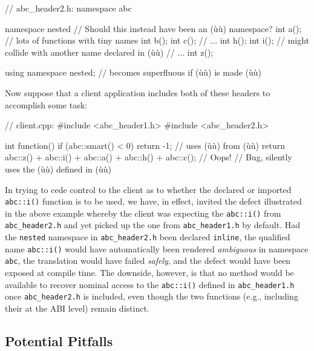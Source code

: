 \begin{emcppslisting}[emcppsbatch=e6]
// abc_header2.h:
namespace abc
{
    namespace nested  // Should this instead have been an (ù{}ù) namespace?
    {
        int a();  // lots of functions with tiny names
        int b();
        int c();
        // ...
        int h();
        int i();  // might collide with another name declared in (ù{}ù)
        // ...
        int z();
    }

    using namespace nested;  // becomes superfluous if (ù{}ù) is made (ù{}ù)
}
\end{emcppslisting}

\noindent Now suppose that a client application includes
both of these headers to accomplish some task:

\begin{emcppslisting}[emcppsbatch=e6]
// client.cpp:
#include <abc_header1.h>
#include <abc_header2.h>

int function()
{
    if (abc::smart() < 0) { return -1; }  // uses (ù{}ù) from (ù{}ù)
    return abc::z() + abc::i() + abc::a() + abc::h() + abc::c();  // Oops!
        // Bug, silently uses the (ù{}ù) defined in (ù{}ù)
}
\end{emcppslisting}

\noindent In trying to cede control to the client as to whether the declared or
imported \lstinline!abc::i()! function is to be used, we have, in effect,
invited the defect illustrated in the above example whereby the client
was expecting the \lstinline!abc::i()! from \lstinline!abc_header2.h! and yet
picked up the one from \lstinline!abc_header1.h! by default. Had the
\lstinline!nested! namespace in \lstinline!abc_header2.h! been declared
\lstinline!inline!, the qualified name \lstinline!abc::i()! would have
automatically been rendered \emph{ambiguous} in namespace \lstinline!abc!,
the translation would have failed \emph{safely}, and the defect would
have been exposed at compile time. The downside, however, is that no
method would be available to recover nominal access to the
\lstinline!abc::i()! defined in \lstinline!abc_header1.h! once
\lstinline!abc_header2.h! is included, even though the two functions
(e.g., including their  at the ABI level) remain
distinct.

\subsection[Potential Pitfalls]{Potential Pitfalls}\label{potential-pitfalls-inlinenamespace}

